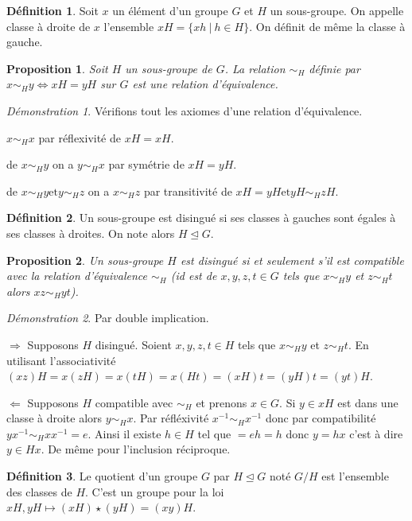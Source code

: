 \documentclass[a4paper, 11pt, french]{book}
\newenvironment{itemise}{\itemize}{\enditemize}
\theoremstyle{plain} %
\newtheorem{proposition}{Proposition}
\theoremstyle{definition} %
\newtheorem{definition}{Définition}
\theoremstyle{remark} %
\newtheorem*{demonstration}{Démonstration}
\newcommand{\1}{\mathds{1}}
\newcommand{\et}{\mathrel{\mathrm{et}}}
\newcommand\ens[2]{\{#1 \ |\ #2\}}
\newcommand\equivalence[3]{
	\begin{demonstration}
		#1
		\begin{itemise}
			\item[$\Longrightarrow$] #2
			\item[$\Longleftarrow$] #3
		\end{itemise}
	\end{demonstration}
}
\begin{document}
\begin{definition}
	Soit $x$ un élément d'un groupe $G$ et $H$ un sous-groupe.
	On appelle classe à droite de $x$ l'ensemble $xH = \ens{xh}{h\in H}$.
	On définit de même la classe à gauche.
\end{definition}

\begin{proposition}
	Soit $H$ un sous-groupe de $G$.
	La relation $\sim_H$ définie par $x\sim_H y\iff xH = yH$  sur $G$ est une relation d'équivalence.
\end{proposition}

\begin{demonstration}
	Vérifions tout les axiomes d'une relation d'équivalence.
	\begin{itemise}
		\item $x\sim_H x$ par réflexivité de $xH = xH$.
		\item de $x\sim_H y$ on a $y\sim_H x$ par symétrie de $xH = yH$.
		\item de $x\sim_H y\et y\sim_H z$ on a $x\sim_H z$ par transitivité de $xH = yH\et yH\sim_H zH$.
	\end{itemise}
\end{demonstration}

\begin{definition}
	Un sous-groupe est disingué si ses classes à gauches sont égales à ses classes à droites.
	On note alors $H \trianglelefteq G$.
\end{definition}

\begin{proposition}
	Un sous-groupe $H$ est disingué si et seulement s'il est compatible avec la relation d'équivalence $\sim_H$
	(id est de $x, y, z, t\in G$ tels que $x\sim_H y$ et $z\sim_H t$ alors $xz\sim_H yt$).
\end{proposition}

\equivalence{Par double implication.}{
	Supposons $H$ disingué.
	Soient $x, y, z, t\in H$ tels que $x\sim_H y$ et $z\sim_H t$.
	En utilisant l'associativité $(xz)H = x(zH) = x(tH) = x(Ht) = (xH)t = (yH)t = (yt)H$.
}{
	Supposons $H$ compatible avec $\sim_H$ et prenons $x\in G$.
	Si $y\in xH$ est dans une classe à droite alors $y\sim_H x$.
	Par réfléxivité $x^{-1}\sim_H x^{-1}$ donc par compatibilité $yx^{-1}\sim_H xx^{-1}=e$.
	Ainsi il existe $h\in H$ tel que $ = eh = h$ donc $y=hx$ c'est à dire $y\in Hx$.
	De même pour l'inclusion réciproque.
}

\begin{definition}
	Le quotient d'un groupe $G$ par $H\trianglelefteq G$ noté $G/H$ est l'ensemble des classes de $H$.
	C'est un groupe pour la loi $xH, yH\longmapsto (xH)\star(yH)=(xy)H$.
\end{definition}
\end{document}
